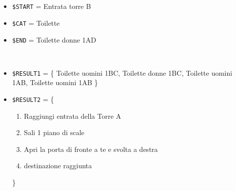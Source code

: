\documentclass[../../SperimentazioniPratiche.tex]{subfiles}
\begin{document}
			\paragraph*{}
			\label{2Prova1B.1}		
			\begin{tcolorbox}[fonttitle=\bfseries, 
								adjusted title={\Large Prova 1B.1}, 
								breakable, 
								sharp corners=south,
								colback=white, 
								colframe=white!60!black]
								
				\begin{description}[leftmargin=0.7cm,labelwidth=!]
				
					\item[Input] \ \par 
        				\begin{itemize}
        					\item \verb|$START| = Entrata torre B
        					\item \verb|$CAT| = Toilette
							\item \verb|$END| = Toilette donne 1AD
        				\end{itemize}
        				
        			\tcbline 
        				
        			\item[Output atteso] \ \par
        				\begin{itemize}
							
							\item \verb|$RESULT1| = \{
								Toilette uomini 1BC, Toilette donne 1BC, Toilette uomini 1AB, Toilette uomini 1AB
							\}         				
        				
        					\item \verb|$RESULT2| = \{
        					\begin{enumerate}
        						\item Raggiungi entrata della Torre A
								\item Sali 1 piano di scale
								\item Apri la porta di fronte a te e svolta a destra
								\item destinazione raggiunta
        					\end{enumerate}
        					\}
        					       					
        					
        				\end{itemize}

					\tcbline        				
        				
        			\item[Output riscontrato] \ \par
        				\begin{description}
        				

\end{description}
\end{description}
\end{tcolorbox}
\end{document}
